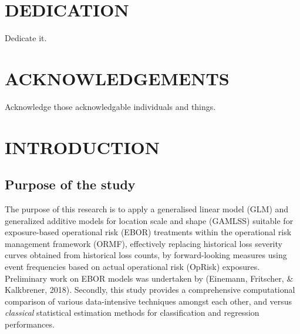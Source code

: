\documentclass{DissertateUSU}
\begin{document}
\chapter*{DEDICATION}

Dedicate it.

\newpage
{}
\fancyhead[R]{\thepage}
\fancyfoot[C]{}
\chapter*{ACKNOWLEDGEMENTS}

Acknowledge those acknowledgable individuals and things.

\newpage
{}
\fancyhead[R]{\thepage}
\fancyfoot[C]{}
\tableofcontents

\newpage
{}
\fancyhead[R]{\thepage}
\fancyfoot[C]{}
\listoftables

\newpage
{}
\fancyhead[R]{\thepage}
\fancyfoot[C]{}
\listoffigures

\newpage
{}

\newpage
{}
\fancyhead[R]{\thepage}
\fancyfoot[C]{}

\chapter{INTRODUCTION}
\label{INTRODUCTION}

\doublespacing

\section{Purpose of the study}
\label{sec:Purpose of the study}

The purpose of this research is to apply a generalised linear model
(GLM) and generalized additive models for location scale and shape
(GAMLSS) suitable for exposure-based operational risk (EBOR) treatments
within the operational risk management framework (ORMF), effectively
replacing historical loss severity curves obtained from historical loss
counts, by forward-looking measures using event frequencies based on
actual operational risk (OpRisk) exposures. Preliminary work on EBOR
models was undertaken by (Einemann, Fritscher, \& Kalkbrener, 2018).
Secondly, this study provides a comprehensive computational comparison
of various data-intensive techniques amongst each other, and versus
\emph{classical} statistical estimation methods for classification and
regression performances.\medskip
\end{document}
